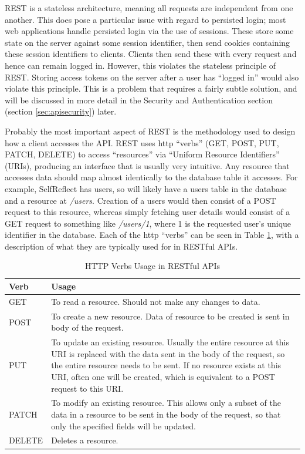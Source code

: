 \documentclass[11pt,openright,a4paper]{report}
\begin{document}
REST is a stateless architecture, meaning all requests are independent from one another. This does pose a particular issue with regard to persisted login; most web applications handle persisted login via the use of sessions. These store some state on the server against some session identifier, then send cookies containing these session identifiers to clients. Clients then send these with every request and hence can remain logged in. However, this violates the stateless principle of REST. Storing access tokens on the server after a user has \enquote{logged in} would also violate this principle. This is a problem that requires a fairly subtle solution, and will be discussed in more detail in the Security and Authentication section (section \ref{sec:apisecurity}) later.

Probably the most important aspect of REST is the methodology used to design how a client accesses the API. REST uses http \enquote{verbs} (GET, POST, PUT, PATCH, DELETE) \parencite{httpmethods} to access \enquote{resources} via \enquote{Uniform Resource Identifiers} (URIs), producing an interface that is usually very intuitive. Any resource that accesses data should map almost identically to the database table it accesses. For example, SelfReflect has users, so will likely have a users table in the database and a resource at \emph{/users}. Creation of a users would then consist of a POST request to this resource, whereas simply fetching user details would consist of a GET request to something like \emph{/users/1}, where 1 is the requested user's unique identifier in the database. Each of the http \enquote{verbs} can be seen in Table \ref{table:httpverbs}, with a description of what they are typically used for in RESTful APIs.

\begin{table}[ht]
\centering
\caption{HTTP Verbs Usage in RESTful APIs}
\label{table:httpverbs}
\begin{tabular}{|p{2cm}|p{12cm}|}
\hline
\textbf{Verb} & \textbf{Usage} \\ \hline
GET &  To read a resource. Should not make any changes to data.  \\  \hline
POST & To create a new resource. Data of resource to be created is sent in body of the request.\\  \hline
PUT &  To update an existing resource. Usually the entire resource at this URI is replaced with the data sent in the body of the request, so the entire resource needs to be sent. If no resource exists at this URI, often one will be created, which is equivalent to a POST request to this URI.\\  \hline
PATCH & To modify an existing resource. This allows only a subset of the data in a resource to be sent in the body of the request, so that only the specified fields will be updated.\\  \hline
DELETE & Deletes a resource. \\  \hline
\end{tabular}
\end{table}
\end{document}
